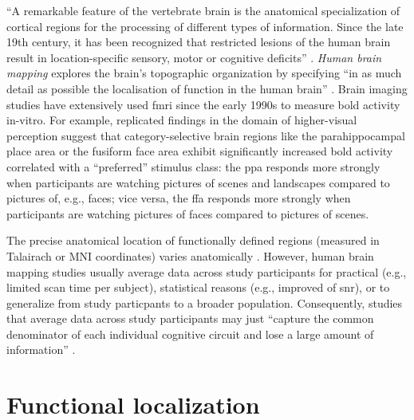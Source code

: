 

``A remarkable feature of the vertebrate brain is the anatomical specialization
of cortical regions for the processing of different types of information. Since
the late 19th century, it has been recognized that restricted lesions of the
human brain result in location-specific sensory, motor or cognitive deficits''
\citep{cohen1994localization}.
\textit{Human brain mapping} \citep[e.g.,][]{raichle2009brief} explores the
brain's topographic organization \citep[e.g.,][]{eickhoff2018topographic} by
specifying ``in as much detail as possible the localisation of function in the
human brain'' \citep{savoy2001history}.
Brain imaging studies have extensively used \ac{fmri} since the early 1990s to
measure \ac{bold} activity in-vitro.
For example, replicated findings in the domain of higher-visual perception
suggest that category-selective brain regions like the parahippocampal place
area
\citep{epstein1998ppa, epstein1999parahippocampal} or the fusiform face area
\citep{kanwisher1997ffa, kanwisher2006fusiform} exhibit significantly increased
\ac{bold} activity correlated with a ``preferred'' stimulus class:
%
the \ac{ppa} responds more strongly when participants are watching pictures of
scenes and landscapes compared to pictures of, e.g., faces;
%
vice versa, the \ac{ffa} responds more strongly when participants are watching
pictures of faces compared to pictures of scenes.

The precise anatomical location of functionally defined regions (measured in
Talairach or MNI coordinates) varies anatomically \citep{friston2006critique,
saxe2006divide}.
%
However, human brain mapping studies usually average data across study
participants for
%
practical (e.g., limited scan time per subject),
%
statistical reasons (e.g., improved of \ac{snr}),
%
or to generalize from study particpants to a broader population.
%
Consequently, studies that average data across study participants may just
``capture the common denominator of each individual cognitive circuit and lose a
large amount of information'' \citep{pinel2007fast}.


\section{Functional localization}

